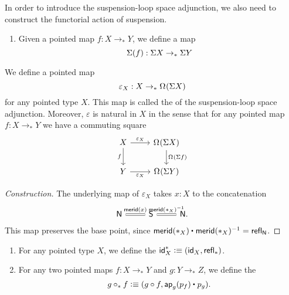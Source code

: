 In order to introduce the suspension-loop space adjunction, we also need to construct the functorial action of suspension.

\begin{defn}
  \begin{enumerate}
  \item Given a pointed map $f:X\to_\ast Y$, we define a map
    \begin{equation*}
      \susp(f):\susp{X}\to_\ast\susp{Y}
    \end{equation*}
  \end{enumerate}
\end{defn}

\begin{defn}
  We define a pointed map
  \begin{equation*}
    \varepsilon_{X} : X \to_\ast \loopspace{\susp{X}}
  \end{equation*}
  for any pointed type $X$. This map is called the  of the suspension-loop space adjunction. Moreover, $\varepsilon$ is natural in $X$ in the sense that for any pointed map $f:X\to_\ast Y$ we have a commuting square
  \begin{equation*}
    \begin{tikzcd}
      X \arrow[r,"\varepsilon_X"] \arrow[d,swap,"f"] & \loopspace{\susp{X}} \arrow[d,"\loopspace{\susp{f}}"] \\
      Y \arrow[r,swap,"\varepsilon_X"] & \loopspace{\susp{Y}}
    \end{tikzcd}
  \end{equation*}
\end{defn}

\begin{proof}[Construction]
  The underlying map of $\varepsilon_X$ takes $x:X$ to the concatenation
  \begin{equation*}
    \begin{tikzcd}
      \north \arrow[r,equals,"\merid(x)"] & \south \arrow[r,equals,"\merid(\ast_X)^{-1}"] & \north.
    \end{tikzcd}
  \end{equation*}
  This map preserves the base point, since $\ct{\merid(\ast_X)}{\merid(\ast_X)^{-1}}=\refl{\north}$. 
\end{proof}

\begin{defn}
\begin{enumerate}
\item For any pointed type $X$, we define the  $\mathsf{id}^\ast_X\defeq (\idfunc[X],\refl{\ast})$. 
\item For any two pointed maps $f:X\to_\ast Y$ and $g:Y\to_\ast Z$, we define the 
\begin{equation*}
g\mathbin{\circ_\ast} f \defeq (g\circ f,\ct{\ap{g}{p_f}}{p_g}).
\end{equation*}
\end{enumerate}
\end{defn}

